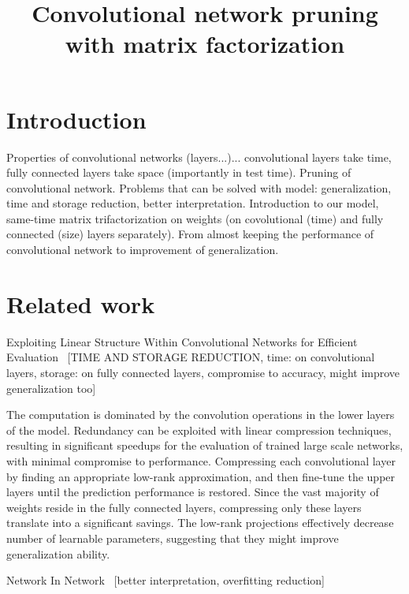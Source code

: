 \documentclass{article} %
\title{Convolutional network pruning with matrix factorization}
\begin{document}
\maketitle

\begin{abstract}

\end{abstract}

\section{Introduction}
Properties of convolutional networks (layers...)... convolutional layers take time, fully connected layers take space (importantly in test time). Pruning of convolutional network. Problems that can be solved with model: generalization, time and storage reduction, better interpretation. Introduction to our model, same-time matrix trifactorization on weights (on covolutional (time) and fully connected (size) layers separately). From almost keeping the performance of convolutional network to improvement of generalization.

\section{Related work}

Exploiting Linear Structure Within Convolutional Networks for Efficient Evaluation~\cite{denton2014exploiting} [TIME AND STORAGE REDUCTION, time: on convolutional layers, storage: on fully connected layers, compromise to accuracy, might improve generalization too]

The computation is dominated by the convolution operations in the lower layers of the model. Redundancy can be exploited with linear compression techniques, resulting in significant speedups for the evaluation of trained large scale networks, with minimal compromise to performance. Compressing each convolutional layer by finding an appropriate low-rank approximation, and then fine-tune the upper layers until the prediction performance is restored. Since the vast majority of weights reside in the fully connected layers, compressing only these layers translate into a significant savings. The low-rank  projections effectively decrease number of learnable parameters, suggesting that they might improve generalization ability.

Network In Network~\cite{DBLP:journals/corr/LinCY13} [better interpretation, overfitting reduction]
\end{document}
